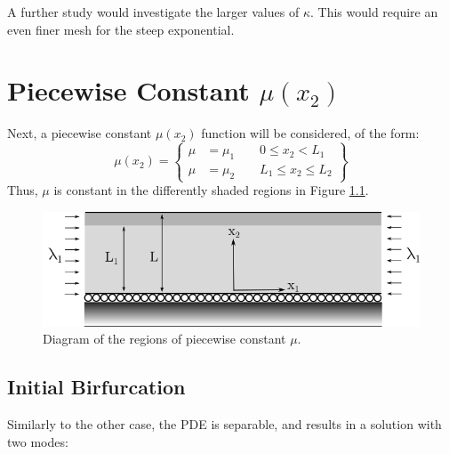 \documentclass[11pt]{report}
\begin{document}
A further study would investigate the larger values of $\kappa$. This would require an even finer mesh for the steep exponential.

\chapter{Piecewise Constant $\mu(x_2)$}
Next, a piecewise constant $\mu(x_2)$ function will be considered, of the form:
\begin{equation}
\mu(x_2) =
\left \{
\begin{aligned}
  \mu &= \mu_1 \qquad 0 \leq x_2 < L_1 \\
  \mu &= \mu_2 \qquad L_1 \leq x_2 \leq L_2
\end{aligned}
\right \}
\end{equation}
Thus, $\mu$ is constant in the differently shaded regions in Figure \ref{fig:stripFig_const}.
\begin{figure}[h]
	\begin{center}
		\includegraphics[scale=0.7]{compressed_strip_drawing_piece_const}
	\end{center}
	\captionsetup{format=hang}
	\caption{Diagram of the regions of piecewise constant $\mu$.}
	\label{fig:stripFig_const}
\end{figure}
\section{Initial Birfurcation}

Similarly to the other case, the PDE is separable, and results in a solution with two modes:
\end{document}
